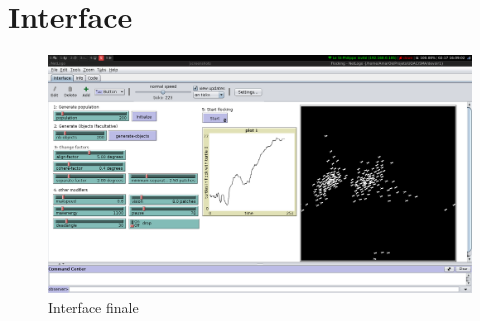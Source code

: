 \documentclass{article}
\begin{document}
\section{Interface}
\begin{figure}[h]
	\begin{center}
		\includegraphics[scale=0.3]{img/interface}
		\caption{Interface finale}
		\label{fig:interface}
	\end{center}
\end{figure}
\end{document}
